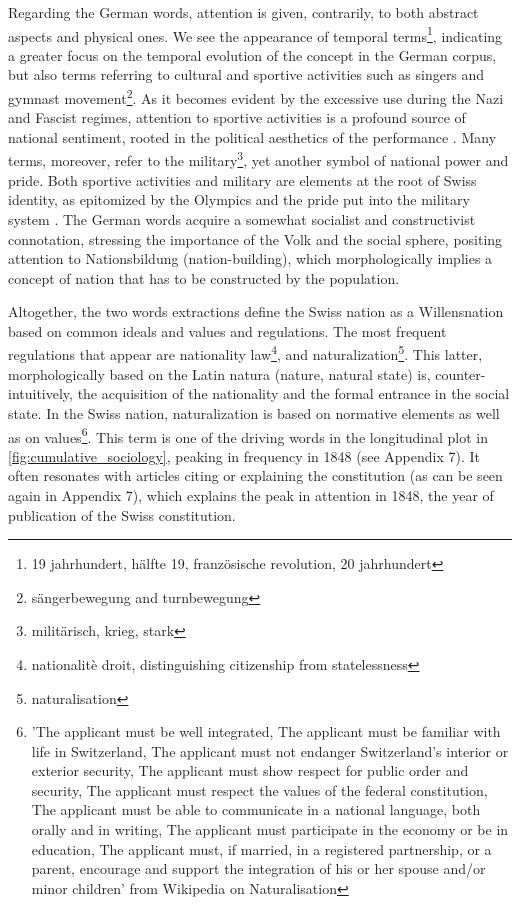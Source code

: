 \documentclass[11pt]{article}
\begin{document}
Regarding the German words, attention is given, contrarily, to both abstract aspects and physical ones. We see the appearance of temporal terms\footnote{19 jahrhundert, hälfte 19, französische revolution, 20 jahrhundert}, indicating a greater focus on the temporal evolution of the concept in the German corpus, but also terms referring to cultural and sportive activities such as singers and gymnast movement\footnote{sängerbewegung and turnbewegung}. As it becomes evident by the excessive use during the Nazi and Fascist regimes, attention to sportive activities is a profound source of national sentiment, rooted in the political aesthetics of the performance \citep{rossol2010performing}. Many terms, moreover, refer to the military\footnote{militärisch, krieg, stark}, yet another symbol of national power and pride. Both sportive activities and military are elements at the root of Swiss identity, as epitomized by the Olympics and the pride put into the military system \citep{seippel1900schweiz}. The German words acquire a somewhat socialist and constructivist connotation, stressing the importance of the Volk and the social sphere, positing attention to Nationsbildung (nation-building), which morphologically implies a concept of nation that has to be constructed by the population. \par
Altogether, the two words extractions define the Swiss nation as a Willensnation based on common ideals and values and regulations. The most frequent regulations that appear are nationality law\footnote{nationalitè droit, distinguishing citizenship from statelessness}, and naturalization\footnote{naturalisation}. This latter, morphologically based on the Latin natura (nature, natural state) is, counter-intuitively, the acquisition of the nationality and the formal entrance in the social state. In the Swiss nation, naturalization is based on normative elements as well as on values\footnote{'The applicant must be well integrated, The applicant must be familiar with life in Switzerland, The applicant must not endanger Switzerland's interior or exterior security, The applicant must show respect for public order and security, The applicant must respect the values of the federal constitution, The applicant must be able to communicate in a national language, both orally and in writing, The applicant must participate in the economy or be in education, The applicant must, if married, in a registered partnership, or a parent, encourage and support the integration of his or her spouse and/or minor children' from Wikipedia on Naturalisation}. This term is one of the driving words in the longitudinal plot in \ref{fig:cumulative_sociology}, peaking in frequency in 1848 (see Appendix 7). It often resonates with articles citing or explaining the constitution (as can be seen again in Appendix 7), which explains the peak in attention in 1848, the year of publication of the Swiss constitution. 
\end{document}
